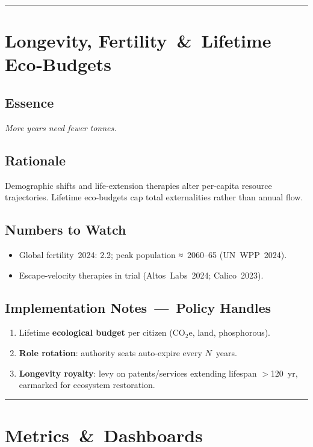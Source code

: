 \bigskip\hrule\bigskip

\section{Longevity, Fertility \& Lifetime Eco‑Budgets}
\subsection*{Essence}
\emph{More years need fewer tonnes.}

\subsection*{Rationale}
Demographic shifts and life‑extension therapies alter per‑capita resource trajectories. Lifetime eco‑budgets cap total externalities rather than annual flow.

\subsection*{Numbers to Watch}
\begin{itemize}
  \item Global fertility 2024: 2.2; peak population ≈ 2060–65 (UN WPP 2024).
  \item Escape‑velocity therapies in trial (Altos Labs 2024; Calico 2023).
\end{itemize}

\subsection*{Implementation Notes — Policy Handles}
\begin{enumerate}[label=\alph*)]
  \item Lifetime \textbf{ecological budget} per citizen (CO$_2$e, land, phosphorous).
  \item \textbf{Role rotation}: authority seats auto‑expire every $N$ years.
  \item \textbf{Longevity royalty}: levy on patents/services extending lifespan $>$120 yr, earmarked for ecosystem restoration.
\end{enumerate}

\bigskip\hrule\bigskip


\section{Metrics \& Dashboards}
\label{sec:metrics}
